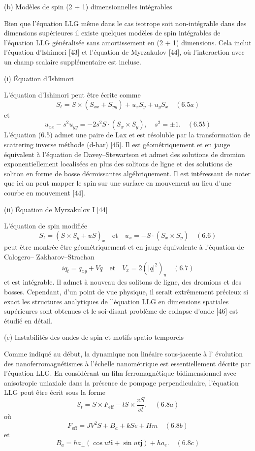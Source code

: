 \documentclass{article}
\begin{document}
   (b) Modèles de spin (2 + 1) dimensionnelles intégrables
   
   Bien que l'équation LLG même dans le cas isotrope soit non-intégrable dans des dimensions supérieures
   il existe quelques modèles de spin intégrables de l'équation LLG généralisée sans amortissement en (2 + 1) dimensions. Cela inclut l'équation d'Ishimori
   [43] et l'équation de Myrzakulov [44], où l'interaction avec un
   champ scalaire supplémentaire est incluse.
   
   (i) Équation d'Ishimori
   
   L'équation d'Ishimori peut être écrite comme
   \[
   S_t = S \times (S_{xx} + S_{yy}) + u_x S_y + u_y S_x \quad (6.5a)
   \]
   et
   \[
   u_{xx} - s^2 u_{yy} = -2s^2 S \cdot (S_x \times S_y), \quad s^2 = \pm 1. \quad (6.5b)
   \]
   L'équation (6.5) admet une paire de Lax et est résoluble par la transformation de scattering inverse
   méthode (d-bar) [45]. Il est géométriquement et en jauge équivalent à
   l'équation de Davey–Stewartson et admet des solutions de dromion exponentiellement localisées
   en plus des solitons de ligne et des solutions de soliton en forme de bosse décroissantes
   algébriquement. Il est intéressant de noter que ici on peut mapper le spin sur une surface en mouvement au lieu d'une courbe en mouvement [44].
   
   (ii) Équation de Myrzakulov I [44]
   
   L'équation de spin modifiée
   \[
   S_t = (S \times S_y + uS)_x \quad \text{et} \quad u_x = -S \cdot (S_x \times S_y) \quad (6.6)
   \]
   peut être montrée être géométriquement et en jauge équivalente à l'équation de Calogero–
   Zakharov–Strachan
   \[
   iq_t = q_{xy} + Vq \quad \text{et} \quad V_x = 2(|q|^2)_y \quad (6.7)
   \]
   et est intégrable. Il admet à nouveau des solitons de ligne, des dromions et des bosses.
   Cependant, d'un point de vue physique, il serait extrêmement précieux si exact
   les structures analytiques de l'équation LLG en dimensions spatiales supérieures sont obtenues
   et le soi-disant problème de collapse d'onde [46] est étudié en détail.
   
   (c) Instabilités des ondes de spin et motifs spatio-temporels
   
   Comme indiqué au début, la dynamique non linéaire sous-jacente à l'
   évolution des nanoferromagnétismes à l'échelle nanométrique est essentiellement décrite par l'équation LLG.
   En considérant un film ferromagnétique bidimensionnel avec anisotropie uniaxiale dans la présence de pompage perpendiculaire, l'équation LLG peut être
   écrit sous la forme
   \[
   S_t = S \times F_{\text{eff}} - lS \times \frac{vS}{vt}, \quad (6.8a)
   \]
   où
   \[
   F_{\text{eff}} = JV^2 S + B_a + kS e + H m \quad (6.8b)
   \]
   et
   \[
   B_a = ha_{\perp} (\cos ut \mathbf{i} + \sin ut \mathbf{j}) + ha_e. \quad (6.8c)
   \]
   
\end{document}
